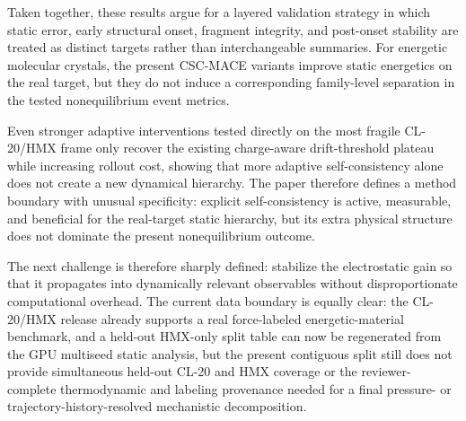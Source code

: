 Taken together, these results argue for a layered validation strategy in which static error, early structural onset, fragment integrity, and post-onset stability are treated as distinct targets rather than interchangeable summaries. For energetic molecular crystals, the present CSC-MACE variants improve static energetics on the real target, but they do not induce a corresponding family-level separation in the tested nonequilibrium event metrics.

Even stronger adaptive interventions tested directly on the most fragile CL-20/HMX frame only recover the existing charge-aware drift-threshold plateau while increasing rollout cost, showing that more adaptive self-consistency alone does not create a new dynamical hierarchy. The paper therefore defines a method boundary with unusual specificity: explicit self-consistency is active, measurable, and beneficial for the real-target static hierarchy, but its extra physical structure does not dominate the present nonequilibrium outcome.

The next challenge is therefore sharply defined: stabilize the electrostatic gain so that it propagates into dynamically relevant observables without disproportionate computational overhead. The current data boundary is equally clear: the CL-20/HMX release already supports a real force-labeled energetic-material benchmark, and a held-out HMX-only split table can now be regenerated from the GPU multiseed static analysis, but the present contiguous split still does not provide simultaneous held-out CL-20 and HMX coverage or the reviewer-complete thermodynamic and labeling provenance needed for a final pressure- or trajectory-history-resolved mechanistic decomposition.
